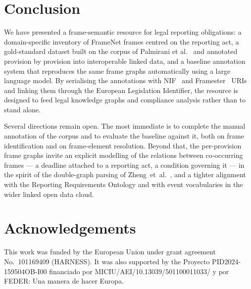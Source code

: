 \documentclass[10pt, a4paper, twocolumn]{article}
\begin{document}
\section{Conclusion}
\label{sec:conclusion}

We have presented a frame-semantic resource for legal reporting obligations: a
domain-specific inventory of FrameNet frames centred on the reporting act, a
gold-standard dataset built on the corpus of Palmirani et
al.~\cite{palmirani-2025-reporting} and annotated provision by provision into
interoperable linked data, and a baseline annotation system that reproduces the
same frame graphs automatically using a large language model. By serialising the
annotations with NIF~\cite{hellmann2013nif} and Framester~\cite{gangemi2016framester}
URIs and linking them through the European Legislation Identifier, the resource is
designed to feed legal knowledge graphs and compliance analysis rather than to
stand alone.

Several directions remain open. The most immediate is to complete the manual
annotation of the corpus and to evaluate the baseline against it, both on frame
identification and on frame-element resolution. Beyond that, the per-provision
frame graphs invite an explicit modelling of the relations between co-occurring
frames --- a deadline attached to a reporting act, a condition governing it ---
in the spirit of the double-graph parsing of
Zheng~et~al.~\cite{zheng-etal-2022-double}, and a tighter alignment with the
Reporting Requirements Ontology and with event vocabularies in the wider linked
open data cloud.

\section*{Acknowledgements}

This work was funded by the European Union under grant agreement
No.~101169409 (HARNESS). It was also supported by the Proyecto
PID2024-159504OB-I00 financiado por MICIU/AEI/10.13039/501100011033/ y por FEDER:
Una manera de hacer Europa.



\end{document}
